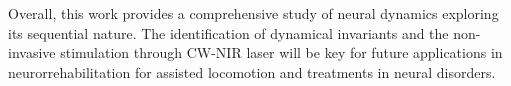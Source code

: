 Overall, this work provides a comprehensive study of neural dynamics exploring its sequential nature. The identification of dynamical invariants and the non-invasive stimulation through CW-NIR laser will be key for future applications in neurorrehabilitation for assisted locomotion and treatments in neural disorders.